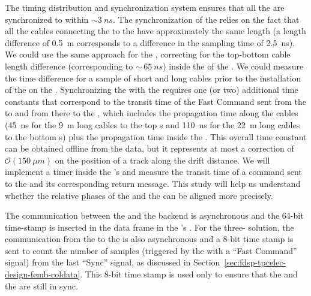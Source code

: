 The timing distribution and synchronization system ensures that
all the  are synchronized to within $\sim\SI{3}{ns}$. %
The synchronization of the   relies on
the fact that all the cables connecting the  to the
 have approximately the same length (a length 
difference of \SI{0.5}{m} corresponds to a difference in the
sampling time of \SI{2.5}{ns}). We could use the same approach %
for the  , correcting %
for the top-bottom  cable length difference (corresponding to $\sim\,\SI{65}{ns}$) %
inside the  of the .  
We could measure the time difference for a sample of short and long cables prior to the installation of the  on
the . %
Synchronizing the  with the  requires one (or two)
additional time constants that correspond to the transit 
time of the Fast Command sent from the  to
 and from there to the ,
which includes the propagation time along the cables
(\SI{45}{ns} for the \SI{9}{m} long cables to the top s
and \SI{110}{ns} for the \SI{22}{m} long cables to the bottom s) 
plus the propagation time inside
the . This overall time constant  %
can be obtained offline
from the data, but it represents at most a correction
of $\mathcal{O}(\SI{150}{\mu m})$ on the position of
a track along the drift distance.
We will implement a timer inside the 's  
and measure the transit time of a command
sent to the  and its corresponding return
message. This study will help us understand whether the 
relative phases of the and the  
can be aligned more precisely.

The communication between the
 and the  backend is asynchronous
and %
the \num{64}-bit time-stamp is inserted in the data frame
in the 's . %
For the three- solution, the communication
from the  to the  is also
asynchronous and a \num{8}-bit time stamp is sent to
count the number of  samples (triggered by
the  with a ``Fast Command'' signal) from the last
``Sync'' signal, as discussed in Section~\ref{sec:fdsp-tpcelec-design-femb-coldata}.
This \num{8}-bit time stamp is used only to ensure
that the  and the  are
still in sync. 

